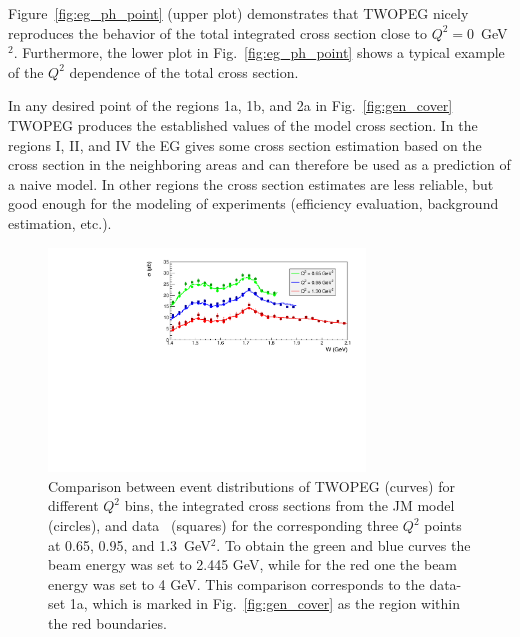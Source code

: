 Figure~\ref{fig:eg_ph_point} (upper plot) demonstrates that TWOPEG nicely reproduces the behavior of the total integrated cross section close to $Q^2 = 0$~GeV$^2$. Furthermore, the lower plot in Fig.~\ref{fig:eg_ph_point} shows a typical example of the $Q^2$ dependence of the total cross section. 

In any desired point of the regions 1a, 1b, and 2a in Fig.~\ref{fig:gen_cover} TWOPEG produces the established values of the model cross section. In the regions I, II, and IV the EG gives some cross section estimation based on the cross section in the neighboring areas and can therefore be used as a prediction of a naive model. In other regions the cross section estimates are less reliable, but good enough for the modeling of experiments (efficiency evaluation, background estimation, etc.).  


\begin{figure}[!ht]
\begin{center}
\includegraphics[width=0.75\textwidth]{pictures/quality/ripani_065_095_130_gen_comp.pdf}
\end{center}
\vspace{-0.6cm}
\caption{\small Comparison between event distributions of TWOPEG (curves) for different $Q^2$ bins, the integrated cross sections from the JM model~\cite{Mokeev:2015lda} (circles), and data~\cite{Ripani:2002ss} (squares) for the corresponding three $Q^2$ points at 0.65, 0.95, and 1.3~GeV$^2$. To obtain the green and blue curves the beam energy was set to 2.445 GeV, while for the red one the beam energy was set to 4 GeV. This comparison corresponds to the data-set 1a, which is marked in Fig.~\ref{fig:gen_cover} as the region within the red boundaries. }
\label{fig:eg_rip}
\end{figure}


